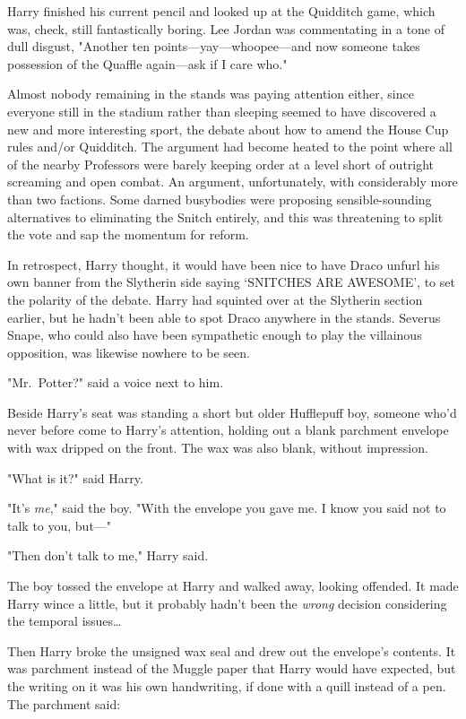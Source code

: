 Harry finished his current pencil and looked up at the Quidditch game, which 
was, check, still fantastically boring. Lee Jordan was commentating in a tone 
of dull disgust, "Another ten points---yay---whoopee---and now someone takes 
possession of the Quaffle again---ask if I care who."

Almost nobody remaining in the stands was paying attention either, since 
everyone still in the stadium rather than sleeping seemed to have discovered a 
new and more interesting sport, the debate about how to amend the House Cup 
rules and/or Quidditch. The argument had become heated to the point where all 
of the nearby Professors were barely keeping order at a level short of outright 
screaming and open combat. An argument, unfortunately, with considerably more 
than two factions. Some darned busybodies were proposing sensible-sounding 
alternatives to eliminating the Snitch entirely, and this was threatening to 
split the vote and sap the momentum for reform.

In retrospect, Harry thought, it would have been nice to have Draco unfurl his 
own banner from the Slytherin side saying `SNITCHES ARE AWESOME', to set the 
polarity of the debate. Harry had squinted over at the Slytherin section 
earlier, but he hadn't been able to spot Draco anywhere in the stands. Severus 
Snape, who could also have been sympathetic enough to play the villainous 
opposition, was likewise nowhere to be seen.

"Mr.~Potter?" said a voice next to him.

Beside Harry's seat was standing a short but older Hufflepuff boy, someone 
who'd never before come to Harry's attention, holding out a blank parchment 
envelope with wax dripped on the front. The wax was also blank, without 
impression.

"What is it?" said Harry.

"It's \emph{me}," said the boy. "With the envelope you gave me. I know you said 
not to talk to you, but---"

"Then don't talk to me," Harry said.

The boy tossed the envelope at Harry and walked away, looking offended. It made 
Harry wince a little, but it probably hadn't been the \emph{wrong} decision 
considering the temporal issues{\ldots}

Then Harry broke the unsigned wax seal and drew out the envelope's contents. It 
was parchment instead of the Muggle paper that Harry would have expected, but 
the writing on it was his own handwriting, if done with a quill instead of a 
pen. The parchment said:

